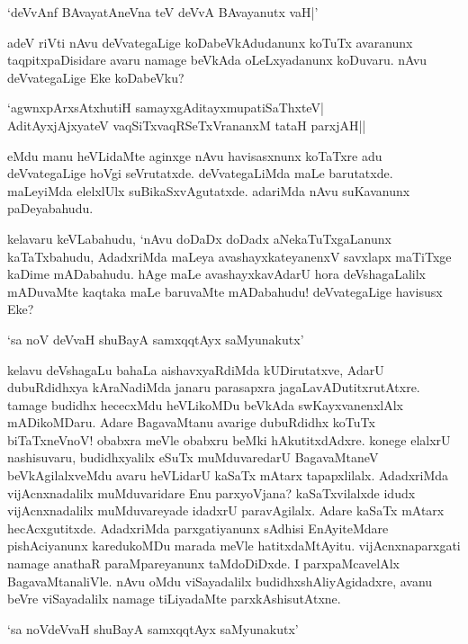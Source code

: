 \begin{shloka}
`deVvAnf BAvayatAneVna teV deVvA BAvayanutx vaH|'
\end{shloka}

adeV riVti nAvu deVvategaLige koDabeVkAdudanunx koTuTx avaranunx taqpitxpaDisidare avaru namage beVkAda oLeLxyadanunx koDuvaru. nAvu deVvategaLige Eke koDabeVku?

\begin{shloka}
`agwnxpArxsAtxhutiH samayxgAditayxmupatiSaThxteV|\\
AditAyxjAjxyateV vaqSiTxvaqRSeTxVrananxM tataH parxjAH||
\end{shloka}

\noindent eMdu manu heVLidaMte aginxge nAvu havisasxnunx koTaTxre adu deVvategaLige hoVgi seVrutatxde. deVvategaLiMda maLe barutatxde. maLeyiMda elelxlUlx suBikaSxvAgutatxde. adariMda nAvu suKavanunx paDeyabahudu.

kelavaru keVLabahudu, `nAvu doDaDx doDadx aNekaTuTxgaLanunx kaTaTxbahudu, AdadxriMda maLeya avashayxkateyanenxV savxlapx maTiTxge kaDime mADabahudu. hAge maLe avashayxkavAdarU hora deVshagaLalilx mADuvaMte kaqtaka maLe baruvaMte mADabahudu! deVvategaLige havisusx Eke?

\begin{shloka}
`sa noV deVvaH shuBayA samxqqtAyx saMyunakutx'
\end{shloka}

kelavu deVshagaLu bahaLa aishavxyaRdiMda kUDirutatxve, AdarU dubuRdidhxya kAraNadiMda janaru parasapxra jagaLavADutitxrutAtxre. tamage budidhx hececxMdu heVLikoMDu beVkAda swKayxvanenxlAlx mADikoMDaru. Adare BagavaMtanu avarige dubuRdidhx koTuTx biTaTxneVnoV! obabxra meVle obabxru beMki hAkutitxdAdxre. konege elalxrU nashisuvaru, budidhxyalilx eSuTx muMduvaredarU BagavaMtaneV beVkAgilalxveMdu avaru heVLidarU kaSaTx mAtarx tapapxlilalx. AdadxriMda vijAcnxnadalilx muMduvaridare Enu parxyoVjana? kaSaTxvilalxde idudx vijAcnxnadalilx muMduvareyade idadxrU paravAgilalx. Adare kaSaTx mAtarx hecAcxgutitxde. AdadxriMda parxgatiyanunx sAdhisi EnAyiteMdare pishAciyanunx karedukoMDu marada meVle hatitxdaMtAyitu. vijAcnxnaparxgati namage anathaR paraMpareyanunx taMdoDiDxde. I parxpaMcavelAlx BagavaMtanaliVle. nAvu oMdu viSayadalilx budidhxshAliyAgidadxre, avanu beVre viSayadalilx namage tiLiyadaMte parxkAshisutAtxne.

\begin{shloka}
`sa noVdeVvaH shuBayA samxqqtAyx saMyunakutx'
\end{shloka} 

